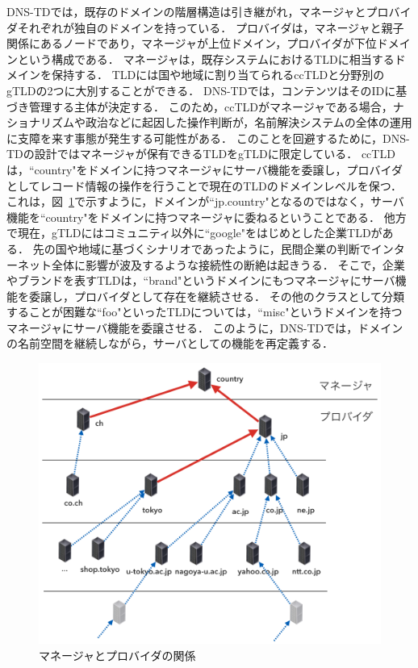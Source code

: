 DNS-TDでは，既存のドメインの階層構造は引き継がれ，マネージャとプロバイダそれぞれが独自のドメインを持っている．
プロバイダは，マネージャと親子関係にあるノードであり，マネージャが上位ドメイン，プロバイダが下位ドメインという構成である．
マネージャは，既存システムにおけるTLDに相当するドメインを保持する．
TLDには国や地域に割り当てられるccTLDと分野別のgTLDの2つに大別することができる．
DNS-TDでは，コンテンツはそのIDに基づき管理する主体が決定する．
このため，ccTLDがマネージャである場合，ナショナリズムや政治などに起因した操作判断が，名前解決システムの全体の運用に支障を来す事態が発生する可能性がある．
このことを回避するために，DNS-TDの設計ではマネージャが保有できるTLDをgTLDに限定している．
ccTLDは，``country"をドメインに持つマネージャにサーバ機能を委譲し，プロバイダとしてレコード情報の操作を行うことで現在のTLDのドメインレベルを保つ．
これは，図~\ref{fig:relationship-manager-provider}で示すように，ドメインが``jp.country"となるのではなく，サーバ機能を``country"をドメインに持つマネージャに委ねるということである．
他方で現在，gTLDにはコミュニティ以外に``google"をはじめとした企業TLDがある．
先の国や地域に基づくシナリオであったように，民間企業の判断でインターネット全体に影響が波及するような接続性の断絶は起きうる．
そこで，企業やブランドを表すTLDは，``brand"というドメインにもつマネージャにサーバ機能を委譲し，プロバイダとして存在を継続させる．
その他のクラスとして分類することが困難な``foo"といったTLDについては，``misc"というドメインを持つマネージャにサーバ機能を委譲させる．
このように，DNS-TDでは，ドメインの名前空間を継続しながら，サーバとしての機能を再定義する．
\begin{figure}[htbp]
 \centering
 \includegraphics[scale=0.5]{figure/relationship-manager-provider.png}
 \caption{マネージャとプロバイダの関係}
 \label{fig:relationship-manager-provider}
\end{figure}

